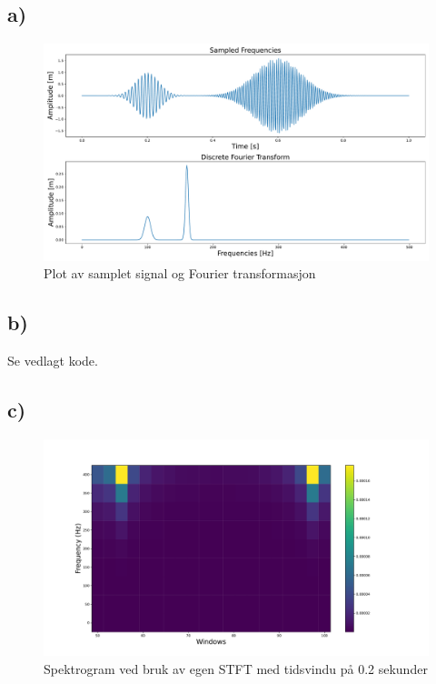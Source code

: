 \documentclass{article}
\begin{document}
\subsection*{a)}
\begin{figure}[h!]
  \centering
  \includegraphics[width = \textwidth]{fig/2.a.pdf}
  \caption{Plot av samplet signal og Fourier transformasjon}
  \label{fig: 2.a}
\end{figure}
\subsection*{b)}
Se vedlagt kode. 
% 

\subsection*{c)}
\begin{figure}[h!]
  \centering
  \includegraphics[width = \textwidth]{fig/2.c.1.pdf}
  \caption{Spektrogram ved bruk av egen STFT med tidsvindu på 0.2 sekunder}
  \label{fig: 2.c.1}
\end{figure}
\end{document}
